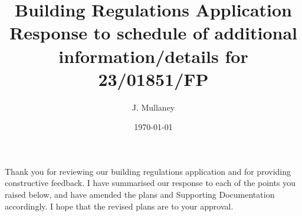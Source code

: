 \documentclass{extension}
\begin{document}
\title{Building Regulations Application \\[2mm]
Response to schedule of additional \\ information/details for 23/01851/FP}
\author{J. Mullaney}
\date{\today}

\maketitle

\vspace{5mm}
Thank you for reviewing our building regulations application and for providing constructive feedback. I have summarised our response to each of the points you raised below, and have amended the plans and Supporting Documentation accordingly. I hope that the revised plans are to your approval.
\end{document}
